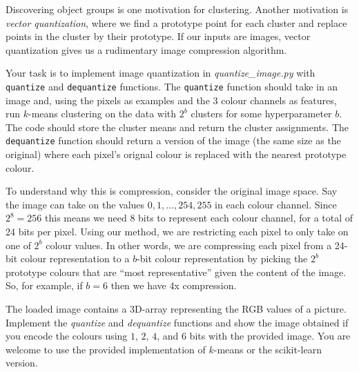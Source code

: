 \documentclass{article}
\def\blu#1{{\color{blu}#1}}
\begin{document}
Discovering object groups is one motivation for clustering. Another motivation is \emph{vector quantization}, where we find a prototype point for each cluster and replace points in the cluster by their prototype. If our inputs are images, vector quantization gives us a rudimentary image compression algorithm.

Your task is to implement image quantization in \emph{quantize\_image.py} with \texttt{quantize} and \texttt{dequantize} functions. The \texttt{quantize} function should take in an image and, using the pixels as examples and the 3 colour channels as features, run $k$-means clustering on the data with $2^b$ clusters for some hyperparameter $b$. The code should store the cluster means and return the cluster assignments. The \texttt{dequantize} function should return a version of the image (the same size as the original) where each pixel's orignal colour is replaced with the nearest prototype colour.

To understand why this is compression, consider the original image space. Say the image can take on the values $0,1,\ldots,254,255$ in each colour channel. Since $2^8=256$ this means we need 8 bits to represent each colour channel, for a total of 24 bits per pixel. Using our method, we are restricting each pixel to only take on one of $2^b$ colour values. In other words, we are compressing each pixel from a 24-bit colour representation to a $b$-bit colour representation by picking the $2^b$ prototype colours that are ``most representative'' given the content of the image. So, for example, if $b=6$ then we have 4x compression.

The loaded image contains a 3D-array representing the RGB values of a picture.
\blu{Implement the \emph{quantize} and \emph{dequantize} functions and show the image
obtained if you encode the colours using $1$, $2$, $4$, and $6$ bits with the provided image.}
You are welcome to use the provided implementation of $k$-means or the scikit-learn version.
\end{document}
